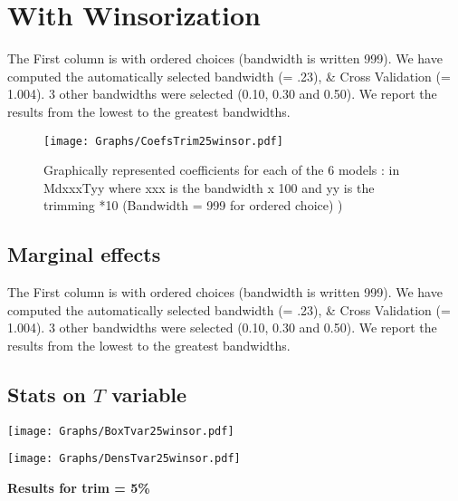 \documentclass[a4paper]{article}
\begin{document}
\section{With Winsorization}
The First column is with ordered choices (bandwidth is written 999). We  have computed the  automatically selected bandwidth  (= .23), \& Cross Validation (= 1.004). 3 other  bandwidths were selected (0.10, 0.30 and 0.50). We report the results from the lowest to the greatest bandwidths. \\



\newpage

\begin{sidewaysfigure}[h!]
\caption{Graphically represented coefficients for each of the 6 models : in MdxxxTyy  where xxx is the bandwidth x 100 and yy is the trimming *10 (Bandwidth = 999 for ordered choice) )}\label{PlotFOK}
\texttt{[image: Graphs/CoefsTrim25winsor.pdf]}

\end{sidewaysfigure}
\clearpage

\subsection{Marginal effects}
%

The First column is with ordered choices (bandwidth is written 999). We  have computed the  automatically selected bandwidth  (= .23), \& Cross Validation (= 1.004). 3 other  bandwidths were selected (0.10, 0.30 and 0.50). We report the results from the lowest to the greatest bandwidths. \\
\newpage
\subsection{Stats on $T$ variable}



\texttt{[image: Graphs/BoxTvar25winsor.pdf]}


\texttt{[image: Graphs/DensTvar25winsor.pdf]}




\newpage

\begin{center}
\Large{\textbf{Results for trim = 5\% }}
\end{center}
\end{document}
